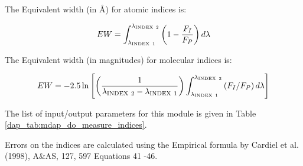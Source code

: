 \documentclass[11pt]{book}
\begin{document}
The Equivalent width (in \AA) for atomic indices is:

\[
EW =  \int_{\lambda_{\rm INDEX\ 1}}^{\lambda_{\rm INDEX\ 2}} \left( 1 - \frac{F_I}{F_P} \right) d\lambda
\]

The Equivalent width (in magnitudes) for molecular indices is:

\[
EW =  -2.5 \ln \left[ \left( \frac{1}{\lambda_{\rm INDEX\ 2} - \lambda_{\rm INDEX\ 1}} \right)  \int_{\lambda_{\rm INDEX\ 1}}^{\lambda_{\rm INDEX\ 2}} \left( F_I/F_P\right) d\lambda \right]
\]

The list of input/output parameters for this module is given in Table
\ref{dap_tab:mdap_do_measure_indices}.

Errors on the indices are calculated using the Empirical formula by
Cardiel et al. (1998), A\&AS, 127, 597 Equations 41 -46.
\end{document}
